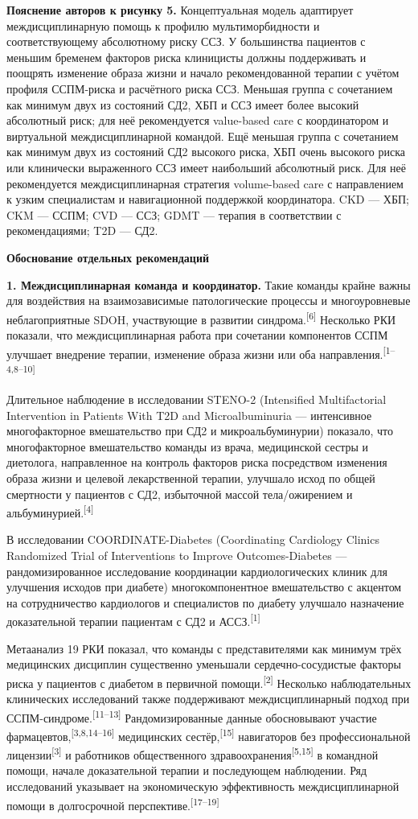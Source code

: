 \documentclass[11pt,a4paper]{article}
\newcommand{\src}[1]{\textsuperscript{[#1]}}
\newcommand{\heading}[1]{\par\medskip\textbf{#1}\par}
\begin{document}
\textbf{Пояснение авторов к рисунку 5.} Концептуальная модель адаптирует междисциплинарную помощь к профилю мультиморбидности и соответствующему абсолютному риску ССЗ. У большинства пациентов с меньшим бременем факторов риска клиницисты должны поддерживать и поощрять изменение образа жизни и начало рекомендованной терапии с учётом профиля ССПМ-риска и расчётного риска ССЗ. Меньшая группа с сочетанием как минимум двух из состояний СД2, ХБП и ССЗ имеет более высокий абсолютный риск; для неё рекомендуется value-based care с координатором и виртуальной междисциплинарной командой. Ещё меньшая группа с сочетанием как минимум двух из состояний СД2 высокого риска, ХБП очень высокого риска или клинически выраженного ССЗ имеет наибольший абсолютный риск. Для неё рекомендуется междисциплинарная стратегия volume-based care с направлением к узким специалистам и навигационной поддержкой координатора. CKD --- ХБП; CKM --- ССПМ; CVD --- ССЗ; GDMT --- терапия в соответствии с рекомендациями; T2D --- СД2.

\heading{Обоснование отдельных рекомендаций}
\textbf{1. Междисциплинарная команда и координатор.} Такие команды крайне важны для воздействия на взаимозависимые патологические процессы и многоуровневые неблагоприятные SDOH, участвующие в развитии синдрома.\src{6} Несколько РКИ показали, что междисциплинарная работа при сочетании компонентов ССПМ улучшает внедрение терапии, изменение образа жизни или оба направления.\src{1--4,8--10}

Длительное наблюдение в исследовании STENO-2 (Intensified Multifactorial Intervention in Patients With T2D and Microalbuminuria --- интенсивное многофакторное вмешательство при СД2 и микроальбуминурии) показало, что многофакторное вмешательство команды из врача, медицинской сестры и диетолога, направленное на контроль факторов риска посредством изменения образа жизни и целевой лекарственной терапии, улучшало исход по общей смертности у пациентов с СД2, избыточной массой тела/ожирением и альбуминурией.\src{4}

В исследовании COORDINATE-Diabetes (Coordinating Cardiology Clinics Randomized Trial of Interventions to Improve Outcomes-Diabetes --- рандомизированное исследование координации кардиологических клиник для улучшения исходов при диабете) многокомпонентное вмешательство с акцентом на сотрудничество кардиологов и специалистов по диабету улучшало назначение доказательной терапии пациентам с СД2 и АССЗ.\src{1}

Метаанализ 19 РКИ показал, что команды с представителями как минимум трёх медицинских дисциплин существенно уменьшали сердечно-сосудистые факторы риска у пациентов с диабетом в первичной помощи.\src{2} Несколько наблюдательных клинических исследований также поддерживают междисциплинарный подход при ССПМ-синдроме.\src{11--13} Рандомизированные данные обосновывают участие фармацевтов,\src{3,8,14--16} медицинских сестёр,\src{15} навигаторов без профессиональной лицензии\src{3} и работников общественного здравоохранения\src{5,15} в командной помощи, начале доказательной терапии и последующем наблюдении. Ряд исследований указывает на экономическую эффективность междисциплинарной помощи в долгосрочной перспективе.\src{17--19}
\end{document}
